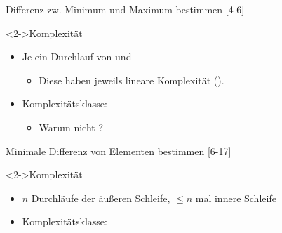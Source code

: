 \begin{frame}
    \begin{exblock}{Differenz zw. Minimum und Maximum bestimmen}
        [4-6]
    \end{exblock}
    \begin{block}<2->{Komplexität}
        \begin{itemize}
            \item Je ein Durchlauf von  und 
            \begin{itemize}
                \item Diese haben jeweils lineare Komplexität (\olin).
            \end{itemize}
            \item Komplexitätsklasse: \olin
            \begin{itemize}
                \item \alert{Warum nicht ?}
            \end{itemize}
        \end{itemize}
    \end{block}
\end{frame}

\begin{frame}
    \begin{exblock}{Minimale Differenz von Elementen bestimmen}
        [6-17]
    \end{exblock}
    \begin{block}<2->{Komplexität}
        \begin{itemize}
            \item $n$ Durchläufe der äußeren Schleife, $\leq n$ mal innere Schleife
            \item Komplexitätsklasse: \osquare
        \end{itemize}
    \end{block}
\end{frame}

